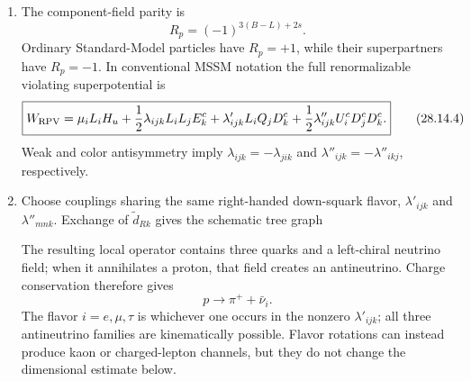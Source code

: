 \begin{enumerate}
\begin{enumerate}
    \item[(b)]
    The component-field parity is
    \[
      \boxed{R_p=(-1)^{3(B-L)+2s}.}
      \tag{28.14.3}
    \]
    Ordinary Standard-Model particles have \(R_p=+1\), while their
    superpartners have \(R_p=-1\).  In conventional MSSM notation the full
    renormalizable violating superpotential is
    \[
      \boxed{
      W_{\rm RPV}=\mu_iL_iH_u
       +\frac12\lambda_{ijk}L_iL_jE_k^c
       +\lambda'_{ijk}L_iQ_jD_k^c
       +\frac12\lambda''_{ijk}U_i^cD_j^cD_k^c.}
      \tag{28.14.4}
    \]
    Weak and color antisymmetry imply
    \(\lambda_{ijk}=-\lambda_{jik}\) and
    \(\lambda''_{ijk}=-\lambda''_{ikj}\), respectively.

    \item[(c)]
    Choose couplings sharing the same right-handed down-squark flavor,
    \(\lambda'_{ijk}\) and \(\lambda''_{mnk}\).  Exchange of
    \(\widetilde d_{Rk}\) gives the schematic tree graph
    \begin{center}
    \end{center}
    The resulting local operator contains three quarks and a left-chiral
    neutrino field; when it annihilates a proton, that field creates an
    antineutrino.  Charge conservation therefore gives
    \[
      p\longrightarrow\pi^++\bar\nu_i.
    \]
    The flavor \(i=e,\mu,\tau\) is whichever one occurs in the nonzero
    \(\lambda'_{ijk}\); all three antineutrino families are kinematically
    possible.  Flavor rotations can instead produce kaon or charged-lepton
    channels, but they do not change the dimensional estimate below.


\end{enumerate}
\end{enumerate}
